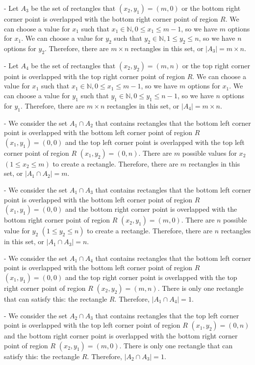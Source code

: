 \documentclass[10pt]{article}
\begin{document}
\begin{enumerate}
\begin{enumerate}
- Let $A_3$ be the set of rectangles that $(x_2,y_1)=(m,0)$ or the bottom right corner point is overlapped with the bottom right corner point of region $R$. We can choose a value for $x_1$ such that $x_1 \in \mathbb{N}, 0 \leq x_1 \leq m-1$, so we have $m$ options for $x_1$. We can choose a value for $y_2$ such that $y_2 \in \mathbb{N}, 1 \leq y_2 \leq n$, so we have $n$ options for $y_2$. Therefore, there are $m \times n$ rectangles in this set, or $|A_3|=m\times n$.


- Let $A_4$ be the set of rectangles that $(x_2,y_2)=(m,n)$ or the top right corner point is overlapped with the top right corner point of region $R$. We can choose a value for $x_1$ such that $x_1 \in \mathbb{N}, 0 \leq x_1 \leq m-1$, so we have $m$ options for $x_1$. We can choose a value for $y_1$ such that $y_1 \in \mathbb{N}, 0 \leq y_1 \leq n-1$, so we have $n$ options for $y_1$. Therefore, there are $m \times n$ rectangles in this set, or $|A_4|=m\times n$.


- We consider the set $A_1 \cap A_2$ that contains rectangles that the bottom left corner point is overlapped with the bottom left corner point of region $R$ $(x_1,y_1)=(0,0)$ and the top left corner point is overlapped with the top left corner point of region $R$ $(x_1,y_2)=(0,n)$. There are $m$ possible values for $x_2$ $(1 \leq x_2 \leq m)$ to create a rectangle. Therefore, there are $m$ rectangles in this set, or $|A_1 \cap A_2| = m$.


- We consider the set $A_1 \cap A_3$ that contains rectangles that the bottom left corner point is overlapped with the bottom left corner point of region $R$ $(x_1,y_1)=(0,0)$ and the bottom right corner point is overlapped with the bottom right corner point of region $R$ $(x_2,y_1)=(m,0)$. There are $n$ possible value for $y_2$ $(1 \leq y_2 \leq n)$ to create a rectangle. Therefore, there are $n$ rectangles in this set, or $|A_1 \cap A_3| = n$.


- We consider the set $A_1 \cap A_4$ that contains rectangles that the bottom left corner point is overlapped with the bottom left corner point of region $R$ $(x_1,y_1)=(0,0)$ and the top right corner point is overlapped with the top right corner point of region $R$ $(x_2,y_2)=(m,n)$. There is only one rectangle that can satisfy this: the rectangle $R$. Therefore, $|A_1 \cap A_4| = 1$.


- We consider the set $A_2 \cap A_3$ that contains rectangles that the top left corner point is overlapped with the top left corner point of region $R$ $(x_1,y_2)=(0,n)$ and the bottom right corner point is overlapped with the bottom right corner point of region $R$ $(x_2,y_1)=(m,0)$. There is only one rectangle that can satisfy this: the rectangle $R$. Therefore, $|A_2 \cap A_3| = 1$.



\end{enumerate}
\end{enumerate}
\end{document}
